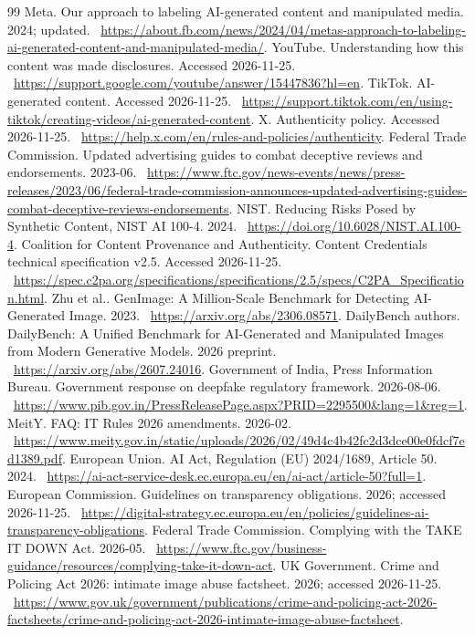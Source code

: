 \documentclass[10pt,a4paper]{article}
\begin{document}
\begin{thebibliography}{99}
 Meta. Our approach to labeling AI-generated content and manipulated media. 2024; updated. \ \url{https://about.fb.com/news/2024/04/metas-approach-to-labeling-ai-generated-content-and-manipulated-media/}.
 YouTube. Understanding how this content was made disclosures. Accessed 2026-11-25. \ \url{https://support.google.com/youtube/answer/15447836?hl=en}.
 TikTok. AI-generated content. Accessed 2026-11-25. \ \url{https://support.tiktok.com/en/using-tiktok/creating-videos/ai-generated-content}.
 X. Authenticity policy. Accessed 2026-11-25. \ \url{https://help.x.com/en/rules-and-policies/authenticity}.
 Federal Trade Commission. Updated advertising guides to combat deceptive reviews and endorsements. 2023-06. \ \url{https://www.ftc.gov/news-events/news/press-releases/2023/06/federal-trade-commission-announces-updated-advertising-guides-combat-deceptive-reviews-endorsements}.
 NIST. Reducing Risks Posed by Synthetic Content, NIST AI 100-4. 2024. \ \url{https://doi.org/10.6028/NIST.AI.100-4}.
 Coalition for Content Provenance and Authenticity. Content Credentials technical specification v2.5. Accessed 2026-11-25. \ \url{https://spec.c2pa.org/specifications/specifications/2.5/specs/C2PA_Specification.html}.
 Zhu et al.. GenImage: A Million-Scale Benchmark for Detecting AI-Generated Image. 2023. \ \url{https://arxiv.org/abs/2306.08571}.
 DailyBench authors. DailyBench: A Unified Benchmark for AI-Generated and Manipulated Images from Modern Generative Models. 2026 preprint. \ \url{https://arxiv.org/abs/2607.24016}.
 Government of India, Press Information Bureau. Government response on deepfake regulatory framework. 2026-08-06. \ \url{https://www.pib.gov.in/PressReleasePage.aspx?PRID=2295500&lang=1&reg=1}.
 MeitY. FAQ: IT Rules 2026 amendments. 2026-02. \ \url{https://www.meity.gov.in/static/uploads/2026/02/49d4c4b42fc2d3dce00e0fdcf7ed1389.pdf}.
 European Union. AI Act, Regulation (EU) 2024/1689, Article 50. 2024. \ \url{https://ai-act-service-desk.ec.europa.eu/en/ai-act/article-50?full=1}.
 European Commission. Guidelines on transparency obligations. 2026; accessed 2026-11-25. \ \url{https://digital-strategy.ec.europa.eu/en/policies/guidelines-ai-transparency-obligations}.
 Federal Trade Commission. Complying with the TAKE IT DOWN Act. 2026-05. \ \url{https://www.ftc.gov/business-guidance/resources/complying-take-it-down-act}.
 UK Government. Crime and Policing Act 2026: intimate image abuse factsheet. 2026; accessed 2026-11-25. \ \url{https://www.gov.uk/government/publications/crime-and-policing-act-2026-factsheets/crime-and-policing-act-2026-intimate-image-abuse-factsheet}.

\end{thebibliography}
\end{document}
